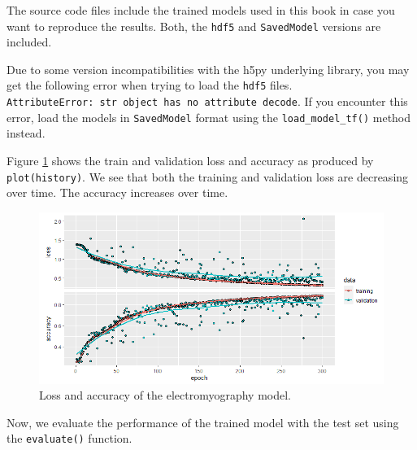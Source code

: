 \documentclass[
  11pt,
]{krantz}
\makeatletter
\newenvironment{Shaded}{\begin{snugshade}}{\end{snugshade}}
\newcommand{\CommentTok}[1]{\textcolor[rgb]{0.37,0.37,0.37}{\textit{#1}}}
\newcommand{\FunctionTok}[1]{\textcolor[rgb]{0,0,0}{#1}}
\newcommand{\NormalTok}[1]{#1}
\newcommand{\SpecialCharTok}[1]{\textcolor[rgb]{0,0,0}{#1}}
\newenvironment{kframe}{%
\medskip{}
\setlength{\fboxsep}{.8em}
 \def\at@end@of@kframe{}%
 \ifinner\ifhmode%
  \def\at@end@of@kframe{\end{minipage}}%
  \begin{minipage}{\columnwidth}%
 \fi\fi%
 \def\FrameCommand##1{\hskip\@totalleftmargin \hskip-\fboxsep
 \colorbox{shadecolor}{##1}\hskip-\fboxsep
     \hskip-\linewidth \hskip-\@totalleftmargin \hskip\columnwidth}%
 \MakeFramed {\advance\hsize-\width
   \@totalleftmargin\z@ \linewidth\hsize
   \@setminipage}}%
 {\par\unskip\endMakeFramed%
 \at@end@of@kframe}
\newenvironment{rmdblock}[1]
  {
  \begin{itemize}
  \renewcommand{\labelitemi}{
    \raisebox{-.7\height}[0pt][0pt]{
      {\setkeys{Gin}{width=3em,keepaspectratio}\texttt{[image: images/icons/\#1]}}
    }
  }
  \setlength{\fboxsep}{1em}
  \begin{kframe}
  \item
  }
  {
  \end{kframe}
  \end{itemize}
  }
\newenvironment{rmdcaution}
  {\begin{rmdblock}{caution}}
  {\end{rmdblock}}
\newenvironment{rmdinfo}
  {\begin{rmdblock}{info}}
  {\end{rmdblock}}
\makeatother
\begin{document}
\begin{rmdinfo}
The source code files include the trained models used in this book in case you want to reproduce the results. Both, the \texttt{hdf5} and \texttt{SavedModel} versions are included.
\end{rmdinfo}

\begin{rmdcaution}
Due to some version incompatibilities with the h5py underlying library, you may get the following error when trying to load the \texttt{hdf5} files. \texttt{AttributeError:\ \textquotesingle{}str\textquotesingle{}\ object\ has\ no\ attribute\ \textquotesingle{}decode\textquotesingle{}}. If you encounter this error, load the models in \texttt{SavedModel} format using the \texttt{load\_model\_tf()} method instead.
\end{rmdcaution}

Figure \ref{fig:nnEMGloss} shows the train and validation loss and accuracy as produced by \texttt{plot(history)}. We see that both the training and validation loss are decreasing over time. The accuracy increases over time.

\begin{figure}

{\centering \includegraphics[width=1\linewidth]{images/nn_emg_loss} 

}

\caption{Loss and accuracy of the electromyography model.}\label{fig:nnEMGloss}
\end{figure}

Now, we evaluate the performance of the trained model with the test set using the \texttt{evaluate()} function.

\begin{Shaded}
\end{Shaded}
\end{document}
